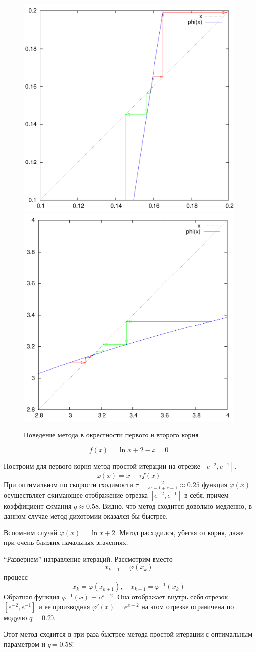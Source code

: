 \documentclass[professionalfonts,compress,unicode]{beamer}
\begin{document}
{
	\begin{figure}%
	\includegraphics[width=0.5\columnwidth]{si2.pdf}%
	\includegraphics[width=0.5\columnwidth]{si.pdf}%
	\caption[]{Поведение метода в окрестности первого и второго корня}
	\end{figure}
}

{
	$$f(x) = \ln x + 2 - x = 0$$
	
	Построим для первого корня метод простой итерации на отрезке $[e^{-2}, e^{-1}]$. 
	$$
	\varphi(x) = x - \tau f(x)
	$$
	При оптимальном по скорости сходимости 
	$\tau = \frac{2}{e^2-1 + e-1} \approx 0.25$ 
	функция $\varphi(x)$ осуществляет сжимающее отображение отрезка $[e^{-2},e^{-1}]$ в себя, причем коэффициент сжмания $q \approx 0.58$.
	Видно, что метод сходится довольно медленно, в данном случае метод дихотомии оказался бы быстрее.
}

{
	Вспомним случай $\varphi(x) = \ln x + 2$. Метод расходился, убегая от корня, даже при очень близких начальных значениях.
	\pause
	
	``Развернем'' направление итераций. Рассмотрим вместо
	$$
	x_{k+1} = \varphi(x_k)
	$$
	процесс
	$$
	x_{k} = \varphi(x_{k+1}), \quad x_{k+1} = \varphi^{-1}(x_k)
	$$
	Обратная функция $\varphi^{-1}(x) = e^{x-2}$. 
	Она отображает внутрь себя отрезок $[e^{-2}, e^{-1}]$ и ее производная $\varphi'(x) = e^{x-2}$ на этом отрезке ограничена по модулю $q = 0.20$.
	
	Этот метод сходится в три раза быстрее метода простой итерации с оптимальным параметром и $q = 0.58$!
}
\end{document}
